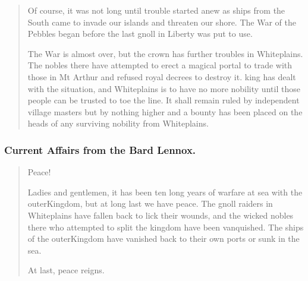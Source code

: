 \begin{multicols}{2}
\begin{quotation}
  Of course, it was not long until trouble started anew as ships from the South came to invade our islands and threaten our shore.
  The War of the Pebbles began before the last gnoll in Liberty was put to use.

  \label{whiteplainsWar}
  The War is almost over, but the crown has further troubles in Whiteplains.
  The nobles there have attempted to erect a magical portal to trade with those in Mt Arthur and refused royal decrees to destroy it.
  \Gls{king} has dealt with the situation, and Whiteplains is to have no more nobility until those people can be trusted to toe the line.
  It shall remain ruled by independent village masters but by nothing higher and a bounty has been placed on the heads of any surviving nobility from Whiteplains.

\end{quotation}

\subsubsection{Current Affairs from the Bard Lennox.}

\begin{quotation}

  Peace!

  Ladies and gentlemen, it has been ten long years of warfare at sea with the \gls{outerKingdom}, but at long last we have peace.
  The gnoll raiders in Whiteplains have fallen back to lick their wounds, and the wicked nobles there who attempted to split the kingdom have been vanquished.
  The ships of the \gls{outerKingdom} have vanished back to their own ports or sunk in the sea.

  At last, peace reigns.

\end{quotation}

\end{multicols}
